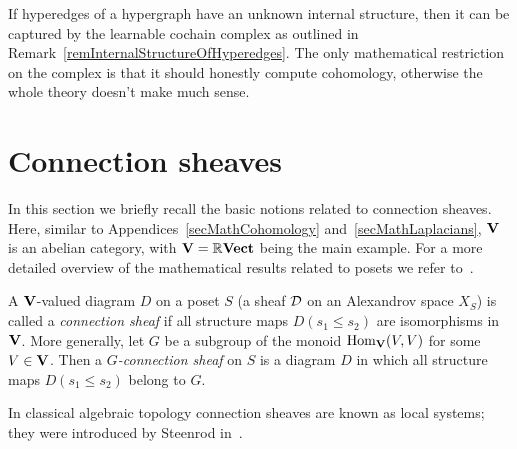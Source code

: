 \begin{ex}
If hyperedges of a hypergraph have an unknown internal structure, then it can be captured by the learnable cochain complex as outlined in Remark~\ref{remInternalStructureOfHyperedges}. The only mathematical restriction on the complex is that it should honestly compute cohomology, otherwise the whole theory doesn't make much sense.
\end{ex}

\section{Connection sheaves}\label{secMathConnection}

In this section we briefly recall the basic notions related to connection sheaves. Here, similar to Appendices~\ref{secMathCohomology} and~\ref{secMathLaplacians}, $\mathbf{V}$ is an abelian category, with $\mathbf{V}=\mathbb{R}\mathbf{Vect}$ being the main example. For a more detailed overview of the mathematical results related to posets we refer to~\cite{Barmak2012GcoloringsOP}.

\begin{defin}\label{definConnectionSheaf}
A $\mathbf{V}$-valued diagram $D$ on a poset $S$ (a sheaf $\mathcal{D}$ on an Alexandrov space $X_S$) is called a \emph{connection sheaf} if all structure maps $D(s_1\leq s_2)$ are isomorphisms in $\mathbf{V}$. More generally, let $G$ be a subgroup of the monoid $\operatorname{Hom}_{\mathbf{V}}(V,V)$ for some $V\in\mathbf{V}$. Then a \emph{$G$-connection sheaf} on $S$ is a diagram $D$ in which all structure maps $D(s_1\leq s_2)$ belong to $G$.
\end{defin}

In classical algebraic topology connection sheaves are known as local systems; they were introduced by Steenrod in~\cite{Steenrod1943HomologyWL}.

